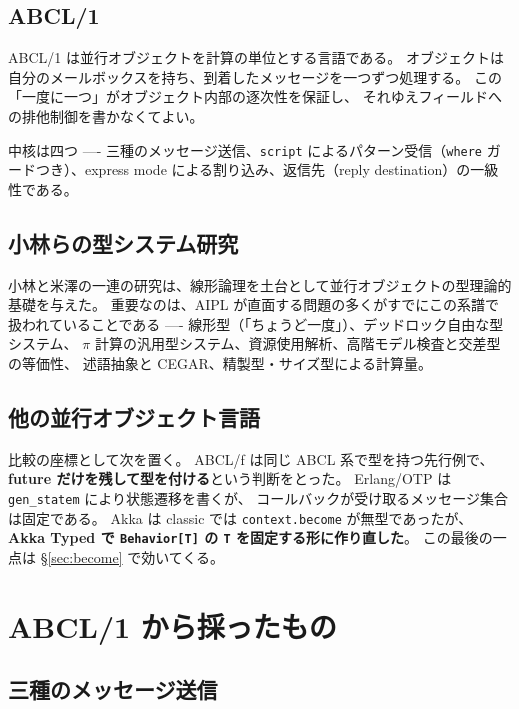\documentclass[11pt,a4paper]{ltjsarticle}
\theoremstyle{definition}
\theoremstyle{remark}
\begin{document}
\subsection{ABCL/1}

ABCL/1 は並行オブジェクトを計算の単位とする言語である。
オブジェクトは自分のメールボックスを持ち、到着したメッセージを一つずつ処理する。
この「一度に一つ」がオブジェクト内部の逐次性を保証し、
それゆえフィールドへの排他制御を書かなくてよい。

中核は四つ ---- 三種のメッセージ送信、\texttt{script} によるパターン受信（\texttt{where}
ガードつき）、express mode による割り込み、返信先（reply destination）の一級性である。

\subsection{小林らの型システム研究}

小林と米澤の一連の研究は、線形論理を土台として並行オブジェクトの型理論的基礎を与えた。
重要なのは、AIPL が直面する問題の多くがすでにこの系譜で扱われていることである
---- 線形型（「ちょうど一度」）、デッドロック自由な型システム、
$\pi$ 計算の汎用型システム、資源使用解析、高階モデル検査と交差型の等価性、
述語抽象と CEGAR、精製型・サイズ型による計算量。

\subsection{他の並行オブジェクト言語}

比較の座標として次を置く。
ABCL/f は同じ ABCL 系で型を持つ先行例で、
\textbf{future だけを残して型を付ける}という判断をとった。
Erlang/OTP は \texttt{gen\_statem} により状態遷移を書くが、
コールバックが受け取るメッセージ集合は固定である。
Akka は classic では \texttt{context.become} が無型であったが、
\textbf{Akka Typed で \texttt{Behavior[T]} の \texttt{T} を固定する形に作り直した}。
この最後の一点は \S\ref{sec:become} で効いてくる。

\section{ABCL/1 から採ったもの}
\label{sec:abcl-take}

\subsection{三種のメッセージ送信}
\end{document}
